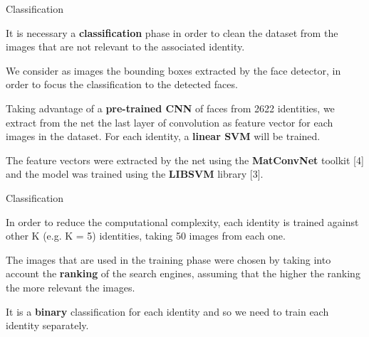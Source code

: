 \begin{tframe}{Classification}

It is necessary a \textbf{classification} phase in order to clean the dataset from the images that are not relevant to the associated identity.

\vspace{0.1in}

We consider as images the bounding boxes extracted by the face detector, in order to focus the classification to the detected faces.

\vspace{0.1in}

Taking advantage of a \textbf{pre-trained CNN} of faces from 2622 identities, we extract from the net the last layer of convolution as feature vector for each images in the dataset. For each identity, a \textbf{linear SVM} will be trained.

\vspace{0.1in}

The feature vectors were extracted by the net using the \textbf{MatConvNet} toolkit [4] and the model was trained using the \textbf{LIBSVM} library [3].

\end{tframe}


\begin{tframe}{Classification}

In order to reduce the computational complexity, each identity is trained against other K (e.g. K = 5) identities, taking 50 images from each one.

\vspace{0.1in}

The images that are used in the training phase were chosen by taking into account the \textbf{ranking} of the search engines, assuming that the higher the ranking the more relevant the images.

\vspace{0.1in}

It is a \textbf{binary} classification for each identity and so we need to train each identity separately.

\end{tframe}